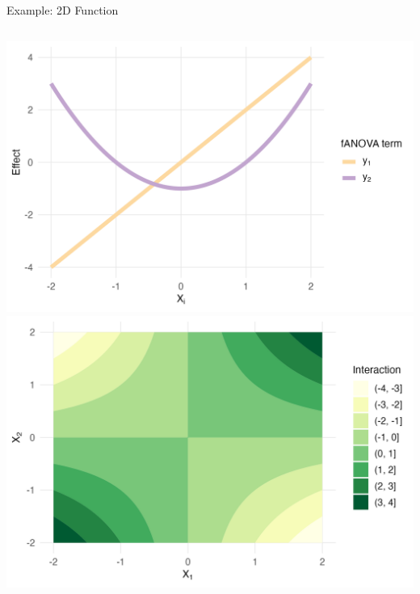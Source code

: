 \begin{frame}{Example: 2D Function} %
  \begin{columns}
      \includegraphics[width=\linewidth]{../images/experiment_section/classical_ex_1_a1p20_a2p00_a11p00_a22p10_a12p10_rhop00_main.png}
      \includegraphics[width=\linewidth]{../images/experiment_section/classical_ex_1_a1p20_a2p00_a11p00_a22p10_a12p10_rhop00_interaction.png}
  \end{columns}
\end{frame}

